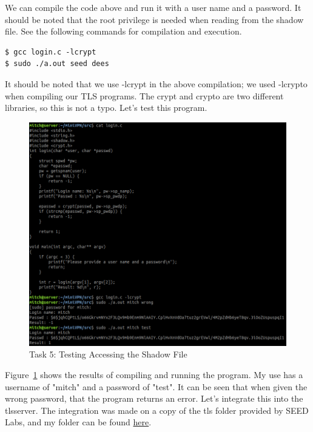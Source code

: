 \documentclass[12pt]{article}
\begin{document}
We can compile the code above and run it with a user name and a password. It should be noted that the
root privilege is needed when reading from the shadow file. See the following commands for compilation
and execution.

\begin{verbatim}
$ gcc login.c -lcrypt
$ sudo ./a.out seed dees
\end{verbatim}

It should be noted that we use -lcrypt in the above compilation; we used -lcrypto when compiling
our TLS programs. The crypt and crypto are two different libraries, so this is not a typo. Let's test this program.

    \begin{figure}[H]
        \begin{center}
            \includegraphics[scale=0.6]{t5_1.PNG}
        \end{center}{}
        \caption{Task 5: Testing Accessing the Shadow File}
        \label{fig:t5_1}
    \end{figure}

Figure~\ref{fig:t5_1} shows the results of compiling and running the program. My use has a username of "mitch" and a password of "test". It can be seen that when given the wrong password, that the program returns an error. Let's integrate this into the tlsserver. The integration was made on a copy of the tls folder provided by SEED Labs, and my folder can be found \href{https://github.com/mitchdz/miniVPN/tree/master/src/mytls}{here}.
\end{document}
